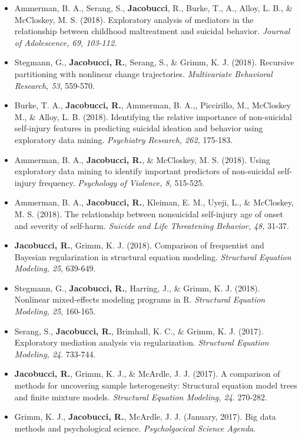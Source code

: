 \documentclass[letterpaper,10pt]{article}
\begin{document}
\begin{itemize}
%
\item[]Ammerman, B. A., Serang, S., \textbf{Jacobucci}, R., Burke, T., A., Alloy, L. B., \& McCloskey, M. S. (2018). Exploratory analysis of mediators in the relationship between childhood maltreatment and suicidal behavior. \emph{Journal of Adolescence, 69, 103-112.}
%
\item[]Stegmann, G., \textbf{Jacobucci, R.}, Serang, S., \& Grimm, K. J. (2018). Recursive partitioning with nonlinear change trajectories. \emph{Multivariate Behavioral Research, 53}, 559-570.
%
\item[]Burke, T. A., \textbf{Jacobucci, R.}, Ammerman, B. A.,, Piccirillo, M., McCloskey M., \& Alloy, L. B. (2018). Identifying the relative importance of non-suicidal self-injury features in predicting suicidal ideation and behavior using exploratory data mining. \emph{Psychiatry Research, 262,} 175-183.
%
\item[]Ammerman, B. A., \textbf{Jacobucci, R.}, \& McCloskey, M. S. (2018). Using exploratory data mining to identify important predictors of non-suicidal self-injury frequency. \emph{Psychology of Violence, 8,} 515-525.
%
\item[]Ammerman, B. A., \textbf{Jacobucci, R.}, Kleiman, E. M., Uyeji, L., \& McCloskey, M. S. (2018). The relationship between nonsuicidal self-injury age of onset and severity of self-harm. \emph{Suicide and Life Threatening Behavior, 48,} 31-37.
%
\item[] \textbf{Jacobucci, R.}, Grimm, K. J. (2018). Comparison of frequentist and Bayesian regularization in structural equation modeling. \emph{Structural Equation Modeling, 25}, 639-649.
%
\item[]Stegmann, G., \textbf{Jacobucci, R.}, Harring, J., \& Grimm, K. J. (2018). Nonlinear mixed-effects modeling programs in R. \emph{Structural Equation Modeling, 25}, 160-165.
%
\item[]Serang, S., \textbf{Jacobucci, R.}, Brimhall, K. C., \& Grimm, K. J. (2017). Exploratory mediation analysis via regularization. \emph{Structural Equation Modeling, 24}. 733-744.
%
\item[]\textbf{Jacobucci, R.}, Grimm, K. J., \& McArdle, J. J. (2017). A comparison of methods for uncovering sample heterogeneity: Structural equation model trees and finite mixture models. \emph{Structural Equation Modeling, 24}. 270-282.
%
\item[]Grimm, K. J., \textbf{Jacobucci, R.}, McArdle, J. J. (January, 2017). Big data methods and psychological science. \emph{Psycholgocical Science Agenda}.

\end{itemize}
\end{document}
